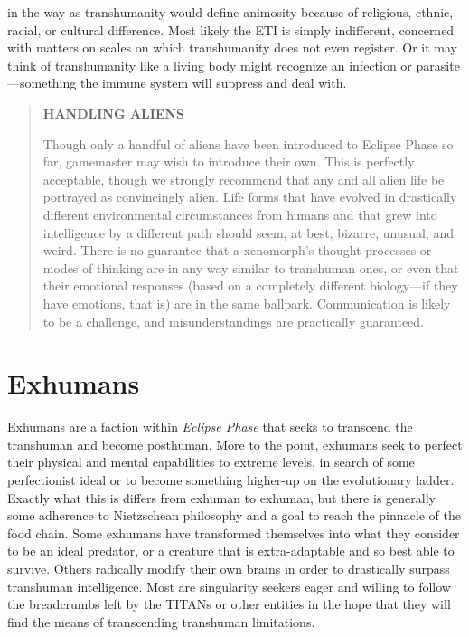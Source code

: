 in the way as transhumanity would define animosity because of religious, ethnic, racial, or cultural difference. Most likely the ETI is simply indifferent, concerned with matters on scales on which transhumanity does not even register. Or it may think of transhumanity like a living body might recognize an infection or parasite—something the immune system will suppress and deal with. 

\begin{quotation} \begin{large} \textbf{HANDLING ALIENS} \end{large} 

Though only a handful of aliens have been introduced to Eclipse Phase so far, gamemaster may wish to introduce their own. This is perfectly acceptable, though we strongly recommend that any and all alien life be portrayed as convincingly alien. Life forms that have evolved in drastically different environmental circumstances from humans and that grew into intelligence by a different path should seem, at best, bizarre, unusual, and weird. There is no guarantee that a xenomorph’s thought processes or modes of thinking are in any way similar to transhuman ones, or even that their emotional responses (based on a completely different biology—if they have emotions, that is) are in the same ballpark. Communication is likely to be a challenge, and misunderstandings are practically guaranteed. \end{quotation} 



\section{Exhumans } 

Exhumans are a faction within \textit{Eclipse Phase} that seeks to transcend the transhuman and become posthuman. More to the point, exhumans seek to perfect their physical and mental capabilities to extreme levels, in search of some perfectionist ideal or to become something higher-up on the evolutionary ladder. Exactly what this is differs from exhuman to exhuman, but there is generally some adherence to Nietzschean philosophy and a goal to reach the pinnacle of the food chain. Some exhumans have transformed themselves into what they consider to be an ideal predator, or a creature that is extra-adaptable and so best able to survive. Others radically modify their own brains in order to drastically surpass transhuman intelligence. Most are singularity seekers eager and willing to follow the breadcrumbs left by the TITANs or other entities in the hope that they will find the means of transcending transhuman limitations. 

